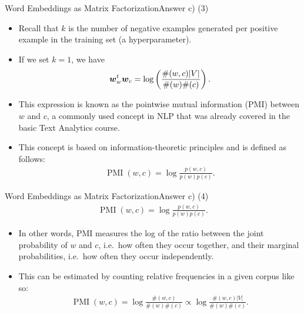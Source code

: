 \documentclass[t]{beamer}
\begin{document}
\begin{frame}{Word Embeddings as Matrix Factorization}{Answer c) (3)}
    \begin{itemize}
        \item Recall that $k$ is the number of negative examples generated per
              positive example in the training set (a hyperparameter).
        \item If we set $k = 1$, we have
              \begin{align*}
                  {\boldsymbol{w}}_{w}^t{\boldsymbol{w}}_{c} & = \log\left(\frac{\#(w,c)|V|}{\#(w)\#(c)}\right). \\
              \end{align*}
        \item This expression is known as the pointwise mutual information (PMI)
              between $w$ and $c$, a commonly used concept in NLP that was
              already covered in the basic Text Analytics course.
        \item This concept is based on information-theoretic principles and is
              defined as follows:
              \begin{align*}
                  \operatorname{PMI}(w,c) = \log\frac{p(w,c)}{p(w)p(c)}.
              \end{align*}
    \end{itemize}
\end{frame}

\begin{frame}{Word Embeddings as Matrix Factorization}{Answer c) (4)}
    \begin{align*}
        \operatorname{PMI}(w,c) = \log\frac{p(w,c)}{p(w)p(c)}.
    \end{align*}
    \begin{itemize}
        \item In other words, PMI measures the log of the ratio between the
              joint probability of $w$ and $c$, i.e.\ how often they occur
              together, and their marginal probabilities, i.e.\ how often they
              occur independently.
        \item This can be estimated by counting relative frequencies in a given
              corpus like so:
              \begin{align*}
                  \operatorname{PMI}(w,c) = \log\frac{\#(w,c)}{\#(w)\#(c)}\propto\log\frac{\#(w,c)|V|}{\#(w)\#(c)}.
              \end{align*}
    \end{itemize}
\end{frame}
\end{document}
